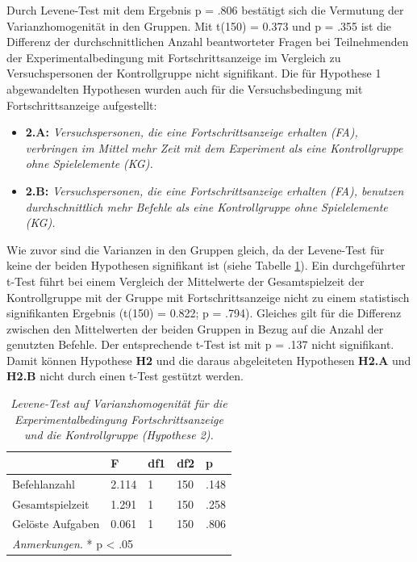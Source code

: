 Durch Levene-Test mit dem Ergebnis p = .806 bestätigt sich die Vermutung der Varianzhomogenität in den Gruppen. Mit t(150) = 0.373 und p = .355 ist die Differenz der durchschnittlichen Anzahl beantworteter Fragen bei Teilnehmenden der Experimentalbedingung mit Fortschrittsanzeige im Vergleich zu Versuchspersonen der Kontrollgruppe nicht signifikant. Die für Hypothese 1 abgewandelten Hypothesen wurden auch für die Versuchsbedingung mit Fortschrittsanzeige aufgestellt: 

\begin{itemize}
    \item \textbf{2.A:} \textit{Versuchspersonen, die eine Fortschrittsanzeige erhalten (FA), verbringen im Mittel mehr Zeit mit dem Experiment als eine Kontrollgruppe ohne Spielelemente (KG).}
    \item \textbf{2.B:} \textit{Versuchspersonen, die eine Fortschrittsanzeige erhalten (FA), benutzen durchschnittlich mehr Befehle als eine Kontrollgruppe ohne Spielelemente (KG).} 
\end{itemize}

 Wie zuvor sind die Varianzen in den Gruppen gleich, da der Levene-Test für keine der beiden Hypothesen signifikant ist (siehe Tabelle \ref{levene_hypo_2}). Ein durchgeführter t-Test führt bei einem Vergleich  der  Mittelwerte  der Gesamtspielzeit der Kontrollgruppe mit der Gruppe mit Fortschrittsanzeige nicht zu einem statistisch signifikanten Ergebnis (t(150) = 0.822; p = .794). Gleiches gilt für die Differenz zwischen den Mittelwerten der beiden Gruppen in Bezug auf die Anzahl der genutzten Befehle. Der entsprechende t-Test ist mit p = .137 nicht signifikant. Damit können Hypothese \textbf{H2} und die daraus abgeleiteten Hypothesen \textbf{H2.A} und \textbf{H2.B} nicht durch einen t-Test gestützt werden.


\begin{table}[htbp]
\centering
\caption{\textit{Levene-Test auf Varianzhomogenität für die Experimentalbedingung Fortschrittsanzeige und die Kontrollgruppe (Hypothese 2).}}
\begin{tabular}{ p{4cm} p{2.0cm} p{2.0cm} p{2.0cm} p{2.0cm} }
 \hline
 & F & df1 &df2 &p \\
 \hline
  Befehlanzahl      & 2.114     & 1 &   150 & .148\\
  Gesamtspielzeit   & 1.291     & 1 &   150 & .258\\
  Gelöste Aufgaben  & 0.061     & 1 &   150 & .806\\
 \hline
  \multicolumn{5}{l}{%
 \small%
\textit{Anmerkungen}. * p < .05
}\\
\end{tabular}
\label{levene_hypo_2}
\end{table}

